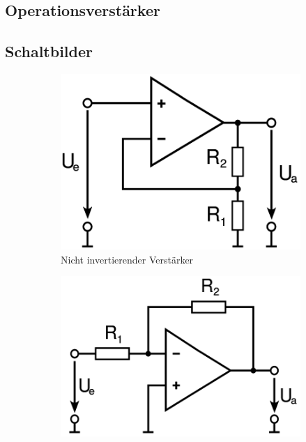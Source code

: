 \subsection{Operationsverstärker}
	\subsection{Schaltbilder}

	\begin{figure}[h]
	\begin{subfigure}{0.25\textwidth}
		\includegraphics[width=\textwidth]{images/Noninverting_Amplifier}
		\caption{Nicht invertierender Verstärker}
	\end{subfigure}
	\begin{subfigure}{0.25\textwidth}
		\includegraphics[width=\textwidth]{images/Inverting_Amplifier}

\end{subfigure}
\end{figure}
